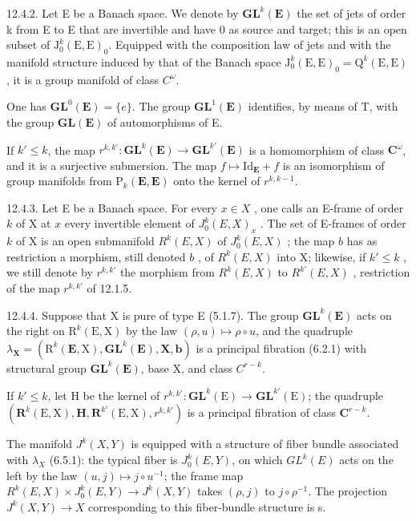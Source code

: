 12.4.2. Let E be a Banach space. We denote by \(\mathbf{GL}^{k}(\mathbf{E})\) the set of jets of order k from E to E that are invertible and have 0 as source and target; this is an open subset of \(\mathrm{J}_{0}^{k}(\mathrm{E},\mathrm{E})_{0}\). Equipped with the composition law of jets and with the manifold structure induced by that of the Banach space \(\mathrm{J}_{0}^{k}(\mathrm{E},\mathrm{E})_{0}=\mathrm{Q}^{k}(\mathrm{E},\mathrm{E})\), it is a group manifold of class \(C^{\omega}\).

One has \(\mathbf{GL}^0 (\mathbf{E}) = \{e\}\). The group \(\mathbf{GL}^1 (\mathbf{E})\) identifies, by means of T, with the group \(\mathbf{GL}(\mathbf{E})\) of automorphisms of E.

If \(k' \leqslant k\), the map \(r^{k, k'}: \mathbf{GL}^k(\mathbf{E}) \to \mathbf{GL}^{k'}(\mathbf{E})\) is a homomorphism of class \(\mathbf{C}^\omega\), and it is a surjective submersion. The map \(f \mapsto \mathrm{Id}_{\mathbf{E}} + f\) is an isomorphism of group manifolds from \(\mathrm{P}_k(\mathbf{E}, \mathbf{E})\) onto the kernel of \(r^{k, k-1}\).

12.4.3. Let E be a Banach space. For every \(x \in X\) , one calls an E-frame of order \(k\) of X at \(x\) every invertible element of \(J_0^k(E, X)_x\) . The set of E-frames of order \(k\) of X is an open submanifold \(R^k(E, X)\) of \(J_0^k(E, X)\) ; the map \(b\) has as restriction a morphism, still denoted \(b\) , of \(R^k(E, X)\) into X; likewise, if \(k' \leqslant k\) , we still denote by \(r^{k, k'}\) the morphism from \(R^k(E, X)\) to \(R^{k'}(E, X)\) , restriction of the map \(r^{k, k'}\) of 12.1.5.

12.4.4. Suppose that X is pure of type E (5.1.7). The group \(\mathbf{GL}^{k}(\mathbf{E})\) acts on the right on \(\mathrm{R}^{k}(\mathrm{E},\mathrm{X})\) by the law \((\rho,u)\mapsto\rho\circ u\), and the quadruple \(\lambda_{\mathbf{X}}=(\mathrm{R}^{k}(\mathbf{E},\mathrm{X}),\mathbf{GL}^{k}(\mathbf{E}),\mathbf{X},\mathbf{b})\) is a principal fibration (6.2.1) with structural group \(\mathbf{GL}^{k}(\mathbf{E})\), base X, and class \(C^{r-k}\).

If \(k' \leqslant k\), let H be the kernel of \(r^{k, k'} \colon \mathbf{GL}^{k}(\mathrm{E}) \to \mathbf{GL}^{k'}(\mathrm{E})\); the quadruple \((\mathbf{R}^k(\mathrm{E}, \mathrm{X}), \mathbf{H}, \mathbf{R}^{k'}(\mathrm{E}, \mathrm{X}), r^{k, k'})\) is a principal fibration of class \(\mathbf{C}^{r-k}\).

The manifold \(J^{k}(X,Y)\) is equipped with a structure of fiber bundle associated with \(\lambda_{X}\) (6.5.1): the typical fiber is \(J_{0}^{k}(E,Y)\), on which \(GL^{k}(E)\) acts on the left by the law \((u,j)\mapsto j\circ u^{-1}\); the frame map \(R^{k}(E,X)\times J_{0}^{k}(E,Y)\to J^{k}(X,Y)\) takes \((\rho,j)\) to \(j\circ\rho^{-1}\). The projection \(J^{k}(X,Y)\to X\) corresponding to this fiber-bundle structure is s.

